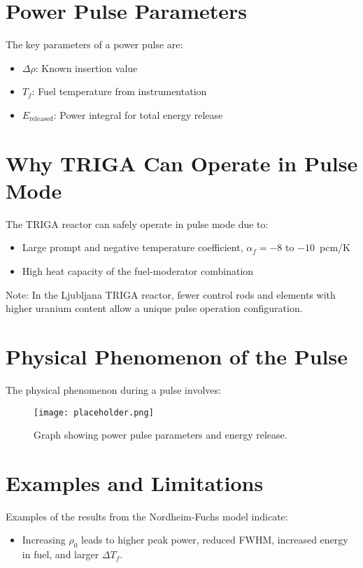 \section{Power Pulse Parameters}
The key parameters of a power pulse are:
\begin{itemize}
    \item $\Delta \rho$: Known insertion value
    \item $T_f$: Fuel temperature from instrumentation
    \item $E_{\text{released}}$: Power integral for total energy release
\end{itemize}

\section{Why TRIGA Can Operate in Pulse Mode}
The TRIGA reactor can safely operate in pulse mode due to:
\begin{itemize}
    \item Large prompt and negative temperature coefficient, $\alpha_f = -8$ to $-10$~pcm/K
    \item High heat capacity of the fuel-moderator combination
\end{itemize}
Note: In the Ljubljana TRIGA reactor, fewer control rods and elements with higher uranium content allow a unique pulse operation configuration.

\section{Physical Phenomenon of the Pulse}
The physical phenomenon during a pulse involves:

\begin{figure}[h]
    \centering
    \texttt{[image: placeholder.png]}
    \caption{Graph showing power pulse parameters and energy release.}
    \label{fig:power_pulse}
\end{figure}

\section{Examples and Limitations}
Examples of the results from the Nordheim-Fuchs model indicate:
\begin{itemize}
    \item Increasing $\rho_0$ leads to higher peak power, reduced FWHM, increased energy in fuel, and larger $\Delta T_f$.
\end{itemize}

